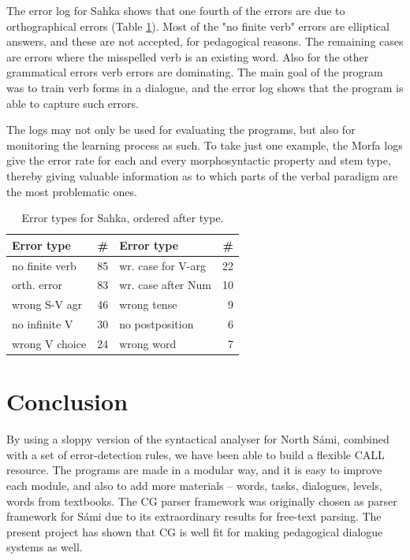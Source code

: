 \documentclass[11pt]{article}
\begin{document}
The error log for Sahka shows that one fourth of the errors are due to orthographical errors (Table \ref{log2}). Most of the "no finite verb" errors are elliptical answers, and these are not accepted, for pedagogical reasons. The remaining cases are errors where the misspelled verb is an existing word. Also for the other grammatical errors verb errors are dominating. The main goal of the program was to train verb forms in a dialogue, and the error log shows that the program is able to capture such errors.

The logs may not only be used for evaluating the programs, but also for monitoring the learning process as such. To take just one example, the Morfa logs give the error rate for each and every morphosyntactic property and stem type, thereby giving valuable information as to which parts of the verbal paradigm are the most problematic ones.

\begin{table}[htdp]
\caption{Error types for Sahka, ordered after type.}
\begin{center}
\begin{tabular}{|l|r|l|r|}
\hline
Error type & \# & Error type & \# \\
\hline												    
no finite verb    & 85 & wr. case for V-arg & 22  \\
orth. error       & 83 & wr. case after Num & 10 \\
wrong S-V agr     & 46 & wrong tense          & 9 \\
no infinite V  & 30 & no postposition      & 6 \\
wrong V choice & 24 & wrong word           & 7  \\
\hline
\end{tabular}
\end{center}
\label{log2}
\end{table}%

\section{Conclusion}

By using a sloppy version of the syntactical analyser for North Sámi, combined with a set of error-detection rules, we have been able to build a flexible CALL resource. The programs are made in a modular way, and it is easy to improve each module, and also to add more materials -- words, tasks, dialogues, levels, words from textbooks. The CG parser framework was originally chosen as parser framework for Sámi due to its extraordinary results for free-text parsing. The present project has shown that CG is well fit for making pedagogical dialogue systems as well.
\end{document}
